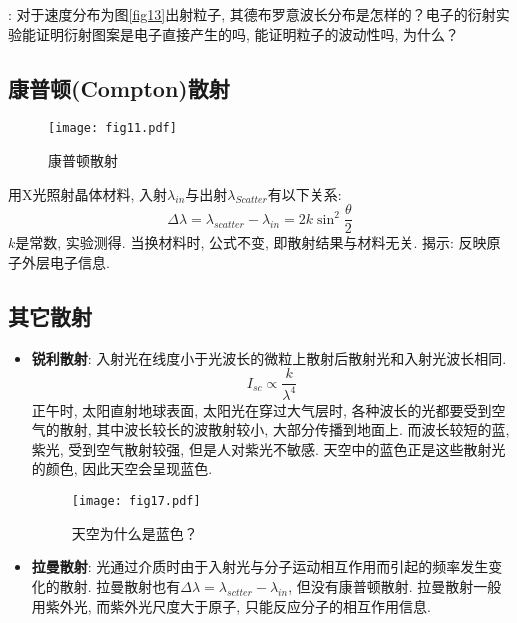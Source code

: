 \noindent[\textbf{思考}]: 对于速度分布为图\ref{fig13}出射粒子, 其德布罗意波长分布是怎样的？电子的衍射实验能证明衍射图案是电子直接产生的吗, 能证明粒子的波动性吗, 为什么？

\subsection{康普顿(Compton)散射}
\begin{figure}[!htb]
\centering
\texttt{[image: fig11.pdf]}
\caption{\label{fig11}康普顿散射}
\end{figure}
用X光照射晶体材料, 入射$\lambda_{in}$与出射$\lambda_{Scatter}$有以下关系: 
\[
\Delta\lambda=\lambda_{scatter}-\lambda_{in}=2k\sin^2\frac{\theta}{2}
\]
$k$是常数, 实验测得. 当换材料时, 公式不变, 即散射结果与材料无关. 揭示: 反映原子外层电子信息. 

\subsection{其它散射}
\begin{itemize}
\item \textbf{锐利散射}: 入射光在线度小于光波长的微粒上散射后散射光和入射光波长相同. 
\[
I_{sc}\propto\frac{k}{\lambda^4}
\]
正午时, 太阳直射地球表面, 太阳光在穿过大气层时, 各种波长的光都要受到空气的散射, 其中波长较长的波散射较小, 大部分传播到地面上. 而波长较短的蓝, 紫光, 受到空气散射较强, 但是人对紫光不敏感. 天空中的蓝色正是这些散射光的颜色, 因此天空会呈现蓝色. 
\begin{figure}[!htb]
\centering
\texttt{[image: fig17.pdf]}
\caption{天空为什么是蓝色？}
\end{figure}

\item \textbf{拉曼散射}: 光通过介质时由于入射光与分子运动相互作用而引起的频率发生变化的散射.  拉曼散射也有$\Delta\lambda=\lambda_{sctter}-\lambda_{in}$, 但没有康普顿散射. 拉曼散射一般用紫外光, 而紫外光尺度大于原子, 只能反应分子的相互作用信息. 
\end{itemize}


